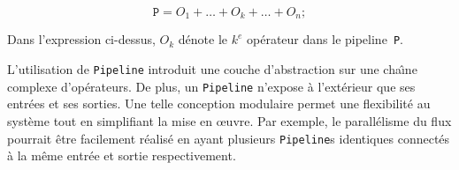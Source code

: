 \[
	\texttt{P} = O_1 +  \ldots + O_k + \ldots + O_n;
\]


Dans l'expression ci-dessus, $O_k$ d\'enote le $k^e$ op\'erateur dans le pipeline~\texttt{P}.

L'utilisation de \texttt{Pipeline} introduit une couche d'abstraction sur une cha\^{\i}ne complexe d'op\'erateurs. De plus, un \texttt{Pipeline} n'expose à l'ext\'erieur que ses entr\'ees et ses sorties. Une telle conception modulaire permet une flexibilit\'e au syst\`eme tout en simplifiant la mise en œuvre. Par exemple, le parall\'elisme du flux pourrait \^etre facilement r\'ealis\'e en ayant plusieurs \texttt{Pipeline}s identiques connect\'es \`a la m\^eme entr\'ee et sortie respectivement.



